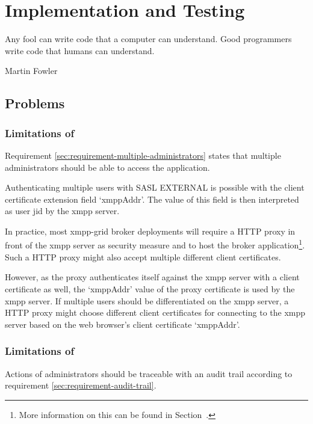 \chapter{Implementation and Testing} %
\epigraph{Any fool can write code that a computer can understand. Good programmers write code that humans can understand.}{Martin Fowler}

\section{Problems}

\subsection{Limitations of \emph{}}\label{sec:limitations-of-requirement-multiple-administrators}

Requirement \ref{sec:requirement-multiple-administrators} states that multiple administrators should be able to access the application.

Authenticating multiple users with SASL EXTERNAL is possible with the client certificate extension field `xmppAddr'.
The value of this field is then interpreted as user \gls{jid} by the \gls{xmpp} server.

In practice, most \gls{xmpp-grid} \gls{broker} deployments will require a HTTP proxy in front of the \gls{xmpp} server as security measure and to host the \gls{broker} application\footnote{
More information on this can be found in Section~.}.
Such a HTTP proxy might also accept multiple different client certificates.

However, as the proxy authenticates itself against the \gls{xmpp} server with a client certificate as well, the `xmppAddr' value of the proxy certificate is used by the \gls{xmpp} server.
If multiple users should be differentiated on the \gls{xmpp} server, a HTTP proxy might choose different client certificates for connecting to the \gls{xmpp} server based on the web browser's client certificate `xmppAddr'.


\subsection{Limitations of \emph{}}

Actions of administrators should be traceable with an audit trail according to requirement \ref{sec:requirement-audit-trail}.

